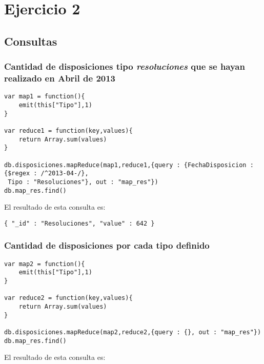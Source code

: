 \section{Ejercicio 2}

\subsection{Consultas}

\subsubsection{Cantidad de disposiciones tipo \textit{resoluciones} que se hayan realizado en Abril de 2013}

\begin{verbatim}
var map1 = function(){
    emit(this["Tipo"],1)
}

var reduce1 = function(key,values){
    return Array.sum(values)
}

db.disposiciones.mapReduce(map1,reduce1,{query : {FechaDisposicion : {$regex : /^2013-04-/},
 Tipo : "Resoluciones"}, out : "map_res"})
db.map_res.find()
\end{verbatim}

El resultado de esta consulta es:

\begin{verbatim}
{ "_id" : "Resoluciones", "value" : 642 }
\end{verbatim}

\subsubsection{Cantidad de disposiciones por cada tipo definido}

\begin{verbatim}
var map2 = function(){
    emit(this["Tipo"],1)
}

var reduce2 = function(key,values){
    return Array.sum(values)
}

db.disposiciones.mapReduce(map2,reduce2,{query : {}, out : "map_res"})
db.map_res.find()
\end{verbatim}

El resultado de esta consulta es:

